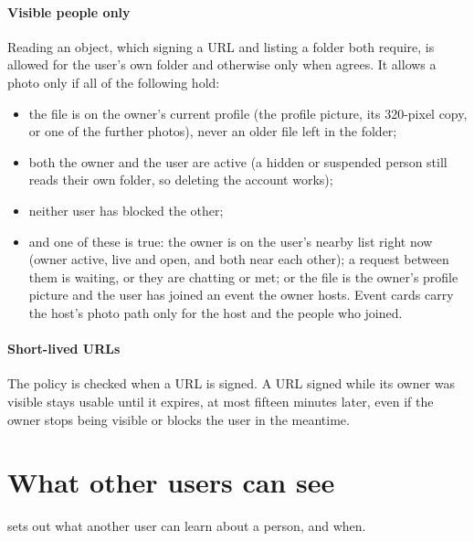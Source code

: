 \paragraph{Visible people only} Reading an object, which signing a URL and listing a folder both require,
is allowed for the user's own folder and otherwise only when  agrees. It
allows a photo only if all of the following hold:

\begin{itemize}
  \item the file is on the owner's current profile (the profile picture, its 320-pixel copy, or one of
    the further photos), never an older file left in the folder;
  \item both the owner and the user are active (a hidden or suspended person still reads their own
    folder, so deleting the account works);
  \item neither user has blocked the other;
  \item and one of these is true: the owner is on the user's nearby list right now (owner active, live and
    open, and both near each other); a request between them is waiting, or they are chatting or met; or
    the file is the owner's profile picture and the user has joined an event the owner hosts. Event cards
    carry the host's photo path only for the host and the people who joined.
\end{itemize}

\paragraph{Short-lived URLs} The policy is checked when a URL is signed. A URL signed while its owner was
visible stays usable until it expires, at most fifteen minutes later, even if the owner stops being
visible or blocks the user in the meantime.

\section{What other users can see}

 sets out what another user can learn about a person, and when.


